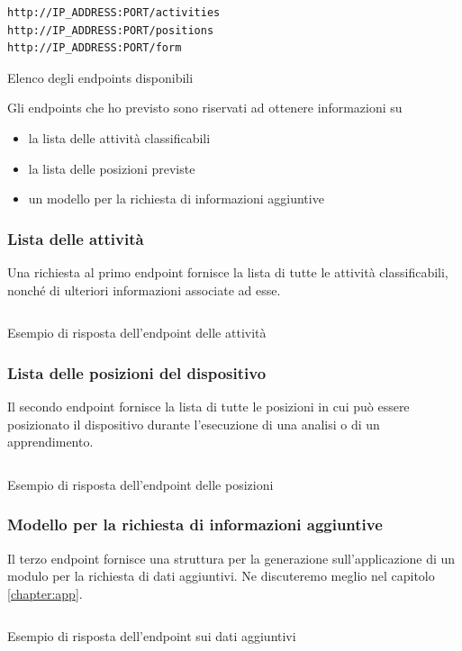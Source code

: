 \begin{listing}[H] 
    \begin{verbatim}
http://IP_ADDRESS:PORT/activities
http://IP_ADDRESS:PORT/positions
http://IP_ADDRESS:PORT/form
    \end{verbatim}
    \caption{Elenco degli endpoints disponibili}
    \label{listing:endpoint-positions}
\end{listing}

\noindent Gli endpoints che ho previsto sono riservati ad ottenere informazioni su
\begin{itemize}
    \item la lista delle attività classificabili
    \item la lista delle posizioni previste
    \item un modello per la richiesta di informazioni aggiuntive
\end{itemize}


\newpage
\subsubsection{Lista delle attività}
Una richiesta al primo endpoint fornisce la lista di tutte le attività classificabili, nonché di ulteriori informazioni associate ad esse.
\vfill
\begin{listing}[H] 
    \inputminted[frame=single,framesep=10pt]{json}{assets/snippets/server/api/activities.json}
    \caption{Esempio di risposta dell'endpoint delle attività}
    \label{listing:response-activities}
\end{listing}

\newpage
\subsubsection{Lista delle posizioni del dispositivo}
Il secondo endpoint fornisce la lista di tutte le posizioni in cui può essere posizionato il dispositivo durante l'esecuzione 
di una analisi o di un apprendimento.
\vfill
\begin{listing}[H] 
    \inputminted[frame=single,framesep=10pt]{json}{assets/snippets/server/api/positions.json}
    \caption{Esempio di risposta dell'endpoint delle posizioni}
    \label{listing:response-positions}
\end{listing}

\newpage
\subsubsection{Modello per la richiesta di informazioni aggiuntive}
Il terzo endpoint fornisce una struttura per la generazione sull'applicazione di un modulo per la richiesta di dati aggiuntivi. 
Ne discuteremo meglio nel capitolo \ref{chapter:app}.
\vfill
\begin{listing}[H] 
    \inputminted[frame=single,framesep=10pt]{json}{assets/snippets/server/api/form.json}
    \caption{Esempio di risposta dell'endpoint sui dati aggiuntivi}
    \label{listing:response-form}
\end{listing}

